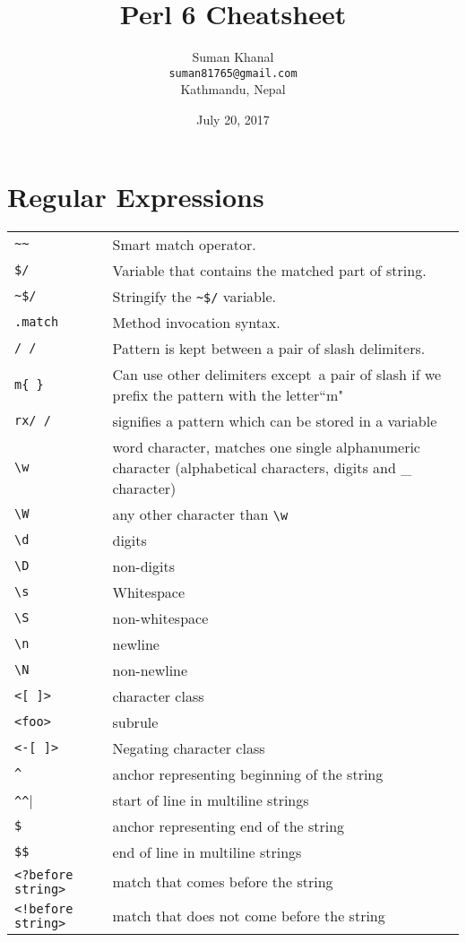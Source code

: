 \documentclass[12pt]{article}
\title{\huge\textbf{Perl 6 Cheatsheet}}
\author{Suman Khanal \\ \texttt{suman81765@gmail.com}\\ Kathmandu, Nepal}
\date{July 20, 2017}
\begin{document}
	\maketitle
	\section{Regular Expressions}
	\begin{longtable}{lp{12cm}}
		\verb!~~!   & Smart match operator. \\
		\verb!$/!  & Variable that contains the matched part of string. \\
		\verb!~$/! & Stringify the \verb!~$/! variable. \\
		\verb!.match!  & Method invocation syntax. \\
		\verb!/ /!  & Pattern is kept between a pair of slash delimiters.\\
		\verb|m{ }|	& Can use other delimiters except\ a pair of slash if we prefix the pattern with the letter``m"\\
		\verb|rx/ /| & 	signifies a pattern which can be stored in a variable\\
		\verb|\w| &	word character, matches one single alphanumeric character (alphabetical characters, digits and \_ character)\\		
		\verb|\W|	& any other character than \verb|\w|\\
		\verb|\d|	& digits\\
		\verb|\D|	& non-digits\\
		\verb|\s|	& Whitespace\\
		\verb|\S|	& non-whitespace\\
		\verb|\n|	& newline\\
		\verb|\N|	& non-newline\\
		\verb|<[ ]>|	& character class\\
		\verb|<foo>| & subrule\\
		\verb|<-[ ]>|	& Negating character class\\
		\verb|^|	& anchor representing beginning of the string\\
		\verb|^^|	& start of line in multiline strings\\
		\verb|$|	& anchor representing end of the string\\
		\verb|$$|	& end of line in multiline strings\\
		\verb|<?before string>|	& match that comes before the string\\
		\verb|<!before string>|	& match that does not come before the string\\

\end{longtable}
\end{document}
